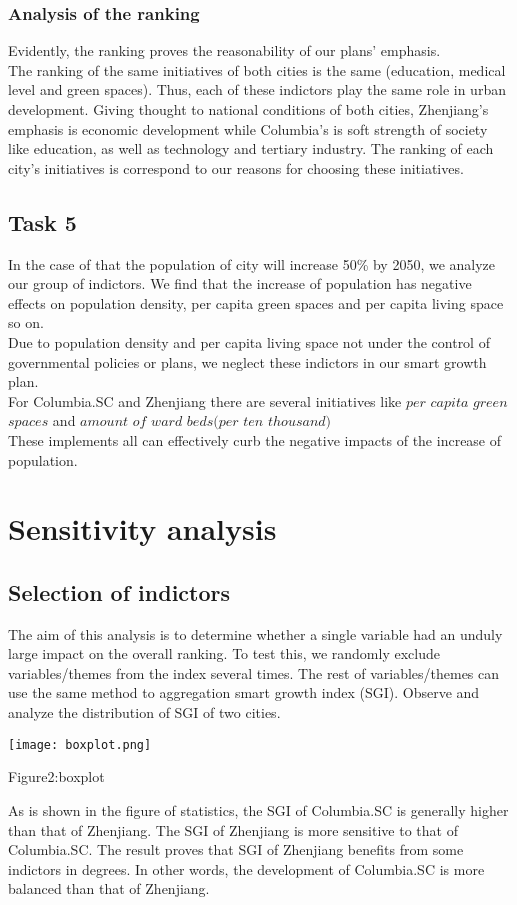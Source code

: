 \documentclass{mcmthesis}
\begin{document}
\subsubsection{Analysis of the ranking}%
Evidently, the ranking proves the reasonability of our plans' emphasis.\\
The ranking of the same initiatives of both cities is the same (education, medical level and green spaces). Thus, each of these indictors play the same role in urban development.  
Giving thought to national conditions of both cities, Zhenjiang's emphasis is economic development while Columbia's is soft strength of society like education, as well as technology and tertiary industry. The ranking of each city's initiatives is correspond to our reasons for choosing these initiatives. \\
\subsection{Task 5}%
In the case of that the population of city will increase 50\% by 2050, we analyze our group of indictors. We find that the increase of population has negative effects on population density, per capita green spaces and per capita living space so on.\\
Due to population density and per capita living space not under the control of governmental policies or plans, we neglect these indictors in our smart growth plan.\\
For Columbia.SC and Zhenjiang there are several initiatives like $per$ $capita$ $green$ $spaces$ and $amount$ $of$ $ward$ $beds(per$ $ten$ $thousand)$\\
These implements all can effectively curb the negative impacts of the increase of population. \\

\section{Sensitivity analysis}
\subsection{Selection of indictors}%
The aim of this analysis is to determine whether a single variable had an unduly large impact on the overall ranking. To test this, we randomly exclude variables/themes from the index several times. The rest of variables/themes can use the same method to aggregation smart growth index (SGI). Observe and analyze the distribution of SGI of two cities.\\
\centerline{\texttt{[image: boxplot.png]}}
\centerline{Figure2:boxplot}
As is shown in the figure of statistics, the SGI of Columbia.SC is generally higher than that of Zhenjiang. The SGI of Zhenjiang is more sensitive to that of Columbia.SC. The result proves that SGI of Zhenjiang benefits from some indictors in degrees. In other words, the development of Columbia.SC is more balanced than that of Zhenjiang.\\
\end{document}
